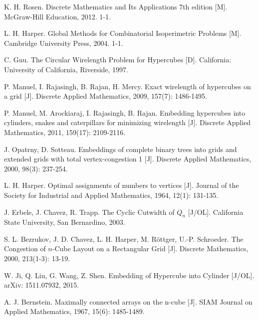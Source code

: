 
\begin{thebibliography}{99}

	K. H. Rosen.
	Discrete Mathematics and Its Applications 7th edition [M].
	McGraw-Hill Education, 2012. 1-1. %

	L. H. Harper.
	Global Methods for Combinatorial Isoperimetric Problems [M].
	Cambridge University Press, 2004. 1-1. %

	C. Guu.
	The Circular Wirelength Problem for Hypercubes [D].
	California: University of California, Riverside, 1997.

	P. Manuel, I. Rajasingh, B. Rajan, H. Mercy.
	Exact wirelength of hypercubes on a grid [J].
	Discrete Applied Mathematics, 2009, 157(7): 1486-1495.

	P. Manuel, M. Arockiaraj, I. Rajasingh, B. Rajan.
	Embedding hypercubes into cylinders, snakes and caterpillars for
	minimizing wirelength [J].
	Discrete Applied Mathematics, 2011, 159(17): 2109-2116.

	J. Opatrny, D. Sotteau.
	Embeddings of complete binary trees into grids and extended grids
	with total vertex-congestion 1 [J].
	Discrete Applied Mathematics, 2000, 98(3): 237-254.

	L. H. Harper.
	Optimal assignments of numbers to vertices [J].
	Journal of the Society for Industrial and Applied Mathematics,
	1964, 12(1): 131-135.

	J. Erbele, J. Chavez, R. Trapp.
	The Cyclic Cutwidth of $Q_n$ [J/OL].
	California State University, San Bernardino, 2003.

	S. L. Bezrukov, J. D. Chavez, L. H. Harper, M. Röttger, U.-P. Schroeder.
	The Congestion of $n$-Cube Layout on a Rectangular Grid [J].
	Discrete Mathematics, 2000, 213(1-3): 13-19.

	W. Ji, Q. Liu, G. Wang, Z. Shen.
	Embedding of Hypercube into Cylinder [J/OL].
	arXiv: 1511.07932, 2015.

	A. J. Bernstein.
	Maximally connected arrays on the n-cube [J].
	SIAM Journal on Applied Mathematics, 1967, 15(6): 1485-1489.

\end{thebibliography}
